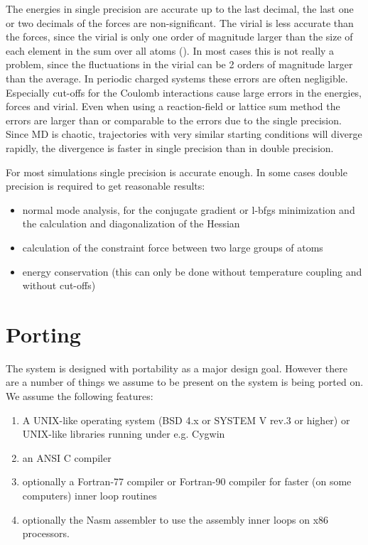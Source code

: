 The energies in single precision are accurate up to the last decimal,
the last one or two decimals of the forces are non-significant.
The virial is less accurate than the forces, since the virial is only one
order of magnitude larger than the size of each element in the sum over
all atoms ().
In most cases this is not really a problem, since the fluctuations in the
virial can be 2 orders of magnitude larger than the average.
In periodic charged systems these errors are often negligible.
Especially cut-offs for the Coulomb interactions cause large errors
in the energies, forces and virial.
Even when using a reaction-field or lattice sum method the errors
are larger than or comparable to the errors due to the single precision.
Since MD is chaotic, trajectories with very similar starting conditions will
diverge rapidly, the divergence is faster in single precision than in double
precision.

For most simulations single precision is accurate enough.
In some cases double precision is required to get reasonable results:
\begin{itemize}
\item normal mode analysis,
for the conjugate gradient or l-bfgs minimization and the calculation and
diagonalization of the Hessian
\item calculation of the constraint force between two large groups of atoms
\item energy conservation (this can only be done without temperature coupling
and without cut-offs)
\end{itemize}

\section{Porting {\gromacs}}
The {\gromacs} system is designed with portability as a major design
goal. However there are a number of things we assume to be present on
the system {\gromacs} is being ported on. We assume the following
features:

\begin{enumerate}
\item   A UNIX-like operating system (BSD 4.x or SYSTEM V rev.3 or higher) 
        or UNIX-like libraries running under e.g. Cygwin
\item   an ANSI C compiler 
\item   optionally a Fortran-77 compiler or Fortran-90 compiler
        for faster (on some computers) inner loop routines
\item   optionally the Nasm assembler to use the assembly inner loops
        on x86 processors.
\end{enumerate}

